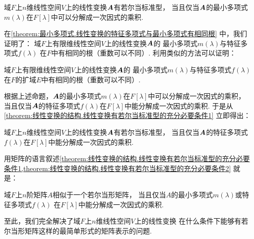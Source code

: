 \begin{corollary}\label{theorem:线性变换的结构.线性变换有若尔当标准型的充分必要条件1}
域\(F\)上\(n\)维线性空间\(V\)上的线性变换\(\boldsymbol{A}\)有若尔当标准型，
当且仅当\(\boldsymbol{A}\)的最小多项式\(m(\lambda)\)在\(F[\lambda]\)中可以分解成一次因式的乘积.
\end{corollary}

在\cref{theorem:最小多项式.线性变换的特征多项式与最小多项式有相同根} 中，我们证明了：
域\(F\)上有限维线性空间\(V\)上的线性变换\(\boldsymbol{A}\)的
最小多项式\(m(\lambda)\)与特征多项式\(f(\lambda)\)
在\(F\)中有相同的根（重数可以不同）.
利用类似的方法可以证明：
\begin{proposition}
域\(F\)上有限维线性空间\(V\)上的线性变换\(\boldsymbol{A}\)的
最小多项式\(m(\lambda)\)与特征多项式\(f(\lambda)\)
在\(F\)的扩域\(E\)中有相同的根（重数可以不同）.
\end{proposition}
根据上述命题，\(\boldsymbol{A}\)的最小多项式\(m(\lambda)\)在\(F[\lambda]\)中可以分解成一次因式的乘积，
当且仅当\(\boldsymbol{A}\)的特征多项式\(f(\lambda)\)在\(F[\lambda]\)中能分解成一次因式的乘积.
于是从\cref{theorem:线性变换的结构.线性变换有若尔当标准型的充分必要条件1} 立即得出：
\begin{corollary}\label{theorem:线性变换的结构.线性变换有若尔当标准型的充分必要条件2}
域\(F\)上\(n\)维线性空间\(V\)上的线性变换\(\boldsymbol{A}\)有若尔当标准型，
当且仅当\(\boldsymbol{A}\)的特征多项式\(f(\lambda)\)在\(F[\lambda]\)中能分解成一次因式的乘积.
\end{corollary}

用矩阵的语言叙述\cref{theorem:线性变换的结构.线性变换有若尔当标准型的充分必要条件1,theorem:线性变换的结构.线性变换有若尔当标准型的充分必要条件2} 就是：
\begin{corollary}
域\(F\)上\(n\)阶矩阵\(A\)相似于一个若尔当形矩阵，
当且仅当\(A\)的最小多项式\(m(\lambda)\)或特征多项式\(f(\lambda)\)
在\(F[\lambda]\)中能分解成一次因式的乘积.
\end{corollary}

至此，我们完全解决了域\(F\)上\(n\)维线性空间\(V\)上的线性变换
在什么条件下能够有若尔当形矩阵这样的最简单形式的矩阵表示的问题.

